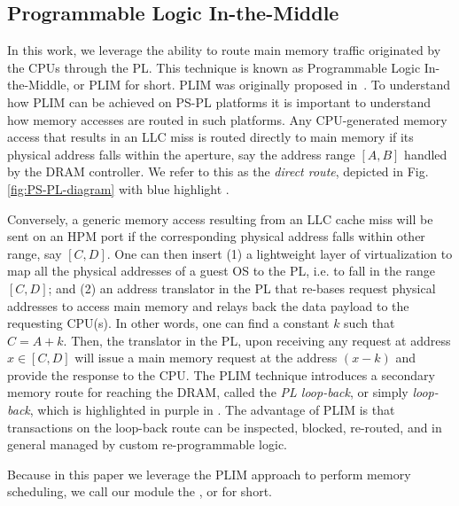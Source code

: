 \subsection{Programmable Logic In-the-Middle}
In this work, we leverage the ability to route main memory traffic
originated by the CPUs through the PL. This technique is known as
Programmable Logic In-the-Middle, or PLIM for short. PLIM was
originally proposed in~\cite{PLIM20}. To understand how PLIM can be
achieved on PS-PL platforms it is important to understand how memory
accesses are routed in such platforms. Any CPU-generated memory access
that results in an LLC miss is routed directly to main memory if its
physical address falls within the aperture, say the address range
$[A,B]$ handled by the DRAM controller. We refer to this as the
\emph{direct route}, depicted in Fig. \ref{fig:PS-PL-diagram} with
blue highlight .

Conversely, a generic memory access resulting from an LLC cache miss
will be sent on an HPM port if the corresponding physical address
falls within other range, say $[C,D]$. One can then insert (1) a
lightweight layer of virtualization to map all the physical addresses
of a guest OS to the PL, i.e. to fall in the range $[C,D]$; and (2) an
address translator in the PL that re-bases request physical addresses
to access main memory and relays back the data payload to the
requesting CPU(s). In other words, one can find a constant $k$ such
that $C = A + k$. Then, the translator in the PL, upon receiving any
request at address $x \in [C, D]$ will issue a main memory request at
the address $(x - k)$ and provide the response to the CPU.  The PLIM
technique introduces a secondary memory route for reaching the DRAM,
called the \emph{PL loop-back}, or simply \emph{loop-back}, which is
highlighted in purple in . The
advantage of PLIM is that transactions on the loop-back route can be
inspected, blocked, re-routed, and in general managed by custom
re-programmable logic.

Because in this paper we leverage the PLIM approach to perform memory
scheduling, we call our module the \schimL, or \schim for short.



